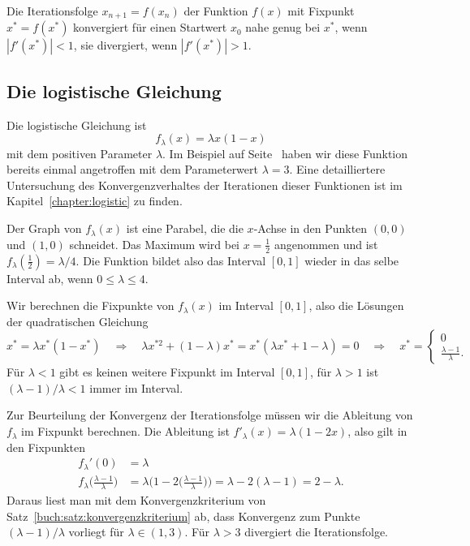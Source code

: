 \begin{satz}
\label{buch:satz:konvergenzkriterium}
Die Iterationsfolge $x_{n+1}=f(x_n)$ der Funktion $f(x)$ mit Fixpunkt
$x^*=f(x^*)$ konvergiert für einen Startwert $x_0$ nahe genug bei $x^*$,
wenn $|f'(x^*)|<1$, sie divergiert, wenn $|f'(x^*)|>1$.
\end{satz}

%
%
\subsection{Die logistische Gleichung
\label{buch:subsection:logistisch}}
Die logistische Gleichung ist 
\[
f_\lambda(x) = \lambda x(1-x)
\]
mit dem positiven Parameter $\lambda$.
Im Beispiel auf Seite~\pageref{buch:beispiel:logistisch3} haben wir
diese Funktion bereits einmal angetroffen mit dem Parameterwert
$\lambda=3$.
Eine detailliertere Untersuchung des Konvergenzverhaltes der Iterationen
dieser Funktionen ist im Kapitel~\ref{chapter:logistic} zu finden.

Der Graph von $f_\lambda(x)$ ist eine Parabel, die die $x$-Achse
in den Punkten $(0,0)$ und $(1,0)$ schneidet.
Das Maximum wird bei $x=\frac12$ angenommen und ist
$f_\lambda(\frac12)=\lambda/4$.
Die Funktion bildet also das Interval $[0,1]$ wieder in das selbe Interval
ab, wenn $0\le \lambda\le 4$.

Wir berechnen die Fixpunkte von $f_\lambda(x)$ im Interval $[0,1]$, also
die Lösungen der quadratischen Gleichung
\[
x^*  = \lambda x^* (1-x^*)
\quad\Rightarrow\quad
\lambda x^{*2} +(1-\lambda)x^*
=
x^* (\lambda x^* + 1-\lambda) 
=0
\quad\Rightarrow\quad
x^*
=
\begin{cases}
0&\\
\displaystyle \frac{\lambda-1}{\lambda}.&
\end{cases}
\]
Für $\lambda<1$ gibt es keinen weitere Fixpunkt im Interval $[0,1]$, für
$\lambda>1$ ist $(\lambda-1)/\lambda<1$ immer im Interval.

Zur Beurteilung der Konvergenz der Iterationsfolge müssen wir die Ableitung
von $f_\lambda$ im Fixpunkt berechnen.
Die Ableitung ist $f'_\lambda(x)=\lambda (1-2x)$, also gilt in den Fixpunkten
\begin{align*}
f_\lambda'(0)
&=
\lambda
\\
f_\lambda\biggl(\frac{\lambda-1}{\lambda}\biggr)
&=
\lambda\biggl( 1-2
\biggl(\frac{\lambda-1}{\lambda}\biggr)\biggr)
=
\lambda-2(\lambda-1)
=
2-\lambda.
\end{align*}
Daraus liest man mit dem Konvergenzkriterium von
Satz~\ref{buch:satz:konvergenzkriterium} ab, dass Konvergenz zum Punkte
$(\lambda-1)/\lambda$ vorliegt für $\lambda \in (1,3)$.
Für $\lambda>3$ divergiert die Iterationsfolge.

